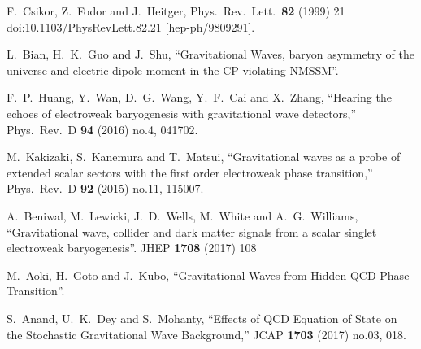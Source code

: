 \documentclass[12pt]{article}
\begin{document}
\begin{thebibliography}{99}
  F.~Csikor, Z.~Fodor and J.~Heitger,
  Phys.\ Rev.\ Lett.\  {\bf 82} (1999) 21
  doi:10.1103/PhysRevLett.82.21
  [hep-ph/9809291].

  L.~Bian, H.~K.~Guo and J.~Shu,
  ``Gravitational Waves, baryon asymmetry of the universe and electric dipole moment in the CP-violating NMSSM''.
 
  
  F.~P.~Huang, Y.~Wan, D.~G.~Wang, Y.~F.~Cai and X.~Zhang,
  ``Hearing the echoes of electroweak baryogenesis with gravitational wave detectors,''
  Phys.\ Rev.\ D {\bf 94} (2016) no.4,  041702.
  
  M.~Kakizaki, S.~Kanemura and T.~Matsui,
  ``Gravitational waves as a probe of extended scalar sectors with the first order electroweak phase transition,''
  Phys.\ Rev.\ D {\bf 92} (2015) no.11,  115007.
  
  A.~Beniwal, M.~Lewicki, J.~D.~Wells, M.~White and A.~G.~Williams,
  ``Gravitational wave, collider and dark matter signals from a scalar singlet electroweak baryogenesis''.
  JHEP {\bf 1708} (2017) 108

  M.~Aoki, H.~Goto and J.~Kubo,
  ``Gravitational Waves from Hidden QCD Phase Transition''.
  
  S.~Anand, U.~K.~Dey and S.~Mohanty,
  ``Effects of QCD Equation of State on the Stochastic Gravitational Wave Background,''
  JCAP {\bf 1703} (2017) no.03,  018.
 


\end{thebibliography}
\end{document}

